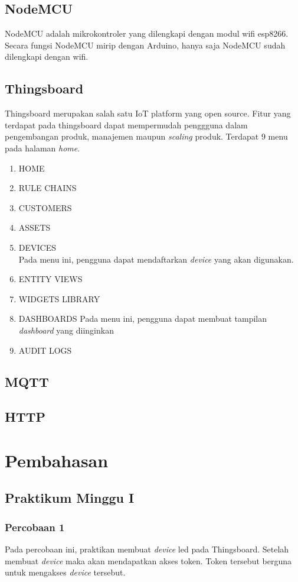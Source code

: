 \documentclass{class}
\begin{document}
  \section{NodeMCU}
  NodeMCU adalah mikrokontroler yang dilengkapi dengan modul wifi esp8266. 
  Secara fungsi NodeMCU mirip dengan Arduino, hanya saja NodeMCU sudah dilengkapi dengan wifi.

  \section{Thingsboard}
  Thingsboard merupakan salah satu IoT platform yang open source. 
  Fitur yang terdapat pada thingsboard dapat mempermudah penggguna dalam pengembangan produk, manajemen maupun \emph{scaling} produk. 
  Terdapat 9 menu pada halaman \emph{home}. 
    \begin{enumerate}
      \item HOME
      \item RULE CHAINS
      \item CUSTOMERS
      \item ASSETS
      \item DEVICES \\
      Pada menu ini, pengguna dapat mendaftarkan \emph{device} yang akan digunakan.
      \item ENTITY VIEWS
      \item WIDGETS LIBRARY
      \item DASHBOARDS
      Pada menu ini, pengguna dapat membuat tampilan \emph{dashboard} yang diinginkan
      \item AUDIT LOGS
    \end{enumerate}
  \section{MQTT}
  \section{HTTP}

  \chapter{Pembahasan}
  \section{Praktikum Minggu I}
    \subsection{Percobaan 1}
    Pada percobaan ini, praktikan membuat \emph{device} led pada Thingsboard.
    Setelah membuat \emph{device} maka akan mendapatkan akses token.
    Token tersebut berguna untuk mengakses \emph{device} tersebut.
\end{document}
